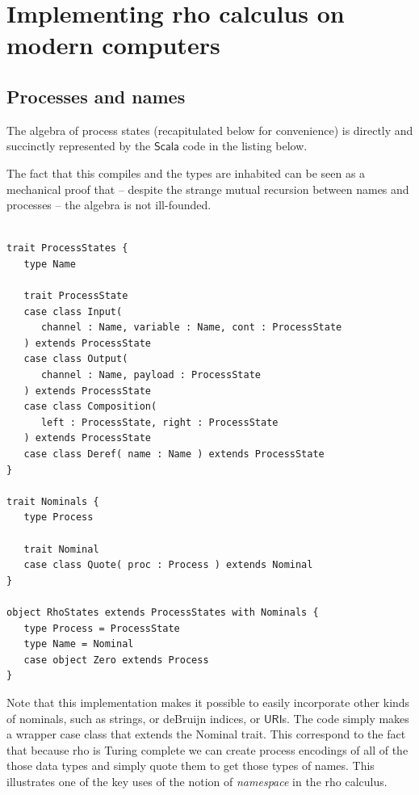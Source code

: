 \section{Implementing rho calculus on modern computers}

\subsection{Processes and names}
The algebra of process states (recapitulated below for convenience) is
directly and succinctly represented by the $\mathsf{Scala}$ code in
the listing below.


The fact that this compiles and the types are inhabited can be seen as
a mechanical proof that -- despite the strange mutual recursion
between names and processes -- the algebra is not ill-founded. \\
\\

\begin{lstlisting}
trait ProcessStates {
   type Name

   trait ProcessState
   case class Input(
      channel : Name, variable : Name, cont : ProcessState
   ) extends ProcessState
   case class Output(
      channel : Name, payload : ProcessState
   ) extends ProcessState
   case class Composition(
      left : ProcessState, right : ProcessState
   ) extends ProcessState
   case class Deref( name : Name ) extends ProcessState
}

trait Nominals {
   type Process

   trait Nominal
   case class Quote( proc : Process ) extends Nominal
}

object RhoStates extends ProcessStates with Nominals {
   type Process = ProcessState
   type Name = Nominal
   case object Zero extends Process
}
\end{lstlisting}

\begin{remark}
  Note that this implementation makes it possible to easily
  incorporate other kinds of nominals, such as strings, or deBruijn
  indices, or $\mathsf{URI}$s. The code simply makes a wrapper case
  class that extends the Nominal trait. This correspond to the fact
  that because rho is Turing complete we can create process encodings
  of all of the those data types and simply quote them to get those
  types of names. This illustrates one of the key uses of the notion
  of \emph{namespace} in the rho calculus.
\end{remark}

